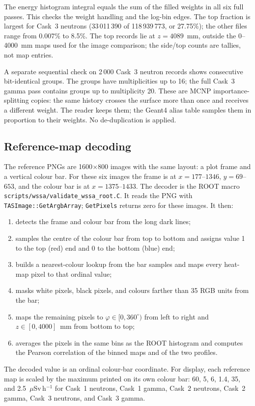 \documentclass[11pt,a4paper]{article}
\begin{document}
The energy histogram integral equals the sum of the filled weights in all six
full passes.  This checks the weight handling and the log-bin edges.  The top
fraction is largest for Cask~3 neutrons (33\,011\,390 of 118\,939\,773, or
27.75\%); the other files range from 0.007\% to 8.5\%.  The top records lie at
$z=4089$~mm, outside the 0--4000~mm maps used for the image comparison; the
side/top counts are tallies, not map entries.

A separate sequential check on 2\,000 Cask~3 neutron records shows consecutive
bit-identical groups.  The groups have multiplicities up to 16; the full Cask~3
gamma pass contains groups up to multiplicity 20.  These are MCNP
importance-splitting copies: the same history crosses the surface more than
once and receives a different weight.  The reader keeps them; the Geant4 alias
table samples them in proportion to their weights.  No de-duplication is
applied.

\subsection{Reference-map decoding}

The reference PNGs are 1600$\times$800 images with the same layout: a plot frame
and a vertical colour bar.  For these six images the frame is at
$x=177$--$1346$, $y=69$--$653$, and the colour bar is at $x=1375$--$1433$.
The decoder is the ROOT macro \texttt{scripts/wssa/validate\_wssa\_root.C}.
It reads the PNG with \texttt{TASImage::GetArgbArray}; \texttt{GetPixels}
returns zero for these images.  It then:
\begin{enumerate}
  \item detects the frame and colour bar from the long dark lines;
  \item samples the centre of the colour bar from top to bottom and assigns
        value 1 to the top (red) end and 0 to the bottom (blue) end;
  \item builds a nearest-colour lookup from the bar samples and maps every
        heat-map pixel to that ordinal value;
  \item masks white pixels, black pixels, and colours farther than 35 RGB units
        from the bar;
  \item maps the remaining pixels to $\varphi\in[0,360^\circ)$ from left to
        right and $z\in[0,4000]$~mm from bottom to top;
  \item averages the pixels in the same bins as the ROOT histogram and computes
        the Pearson correlation of the binned maps and of the two profiles.
\end{enumerate}
The decoded value is an ordinal colour-bar coordinate.  For display, each
reference map is scaled by the maximum printed on its own colour bar: 60, 5, 6,
1.4, 35, and 2.5~$\mu$Sv\,h$^{-1}$ for Cask~1 neutrons, Cask~1 gamma, Cask~2
neutrons, Cask~2 gamma, Cask~3 neutrons, and Cask~3 gamma.
\end{document}
